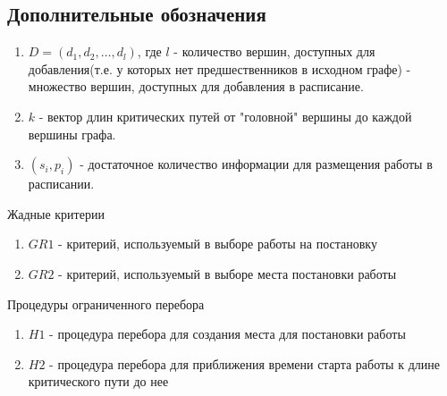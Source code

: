 \documentclass{article}
\begin{document}
\subsection{Дополнительные обозначения}
\begin{enumerate}
    \item $D= \left( d_1, d_2, \dots, d_l \right)$, где $l$ - количество вершин, доступных для добавления(т.е. у которых нет предшественников в исходном графе) - множество вершин, доступных для добавления в расписание.
    \item $k$ - вектор длин критических путей от "головной" вершины до каждой вершины графа.
    \item $\left( s_i, p_i \right)$ - достаточное количество информации для размещения работы в расписании.
\end{enumerate}
Жадные критерии
\begin{enumerate}
    \item $GR1$ - критерий, используемый в выборе работы на постановку
    \item $GR2$ - критерий, используемый в выборе места постановки работы
\end{enumerate}
Процедуры ограниченного перебора
\begin{enumerate}
    \item $H1$ - процедура перебора для создания места для постановки работы
    \item $H2$ - процедура перебора для приближения времени старта работы к длине критического пути до нее
\end{enumerate}
\end{document}
